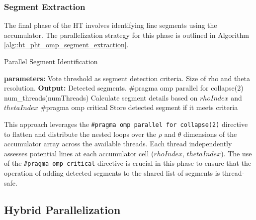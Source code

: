 \documentclass[conference]{IEEEtran}
\begin{document}
             
        \subsubsection{Segment Extraction}
        \label{subsec:omp_segment_extraction}
        
        The final phase of the HT involves identifying line segments using the accumulator. The parallelization strategy for this phase is outlined in Algorithm \ref{alg::ht_pht_omp_segment_extraction}.
        
        \begin{algorithm}
        \caption{Parallel Segment Identification}
        \label{alg::ht_pht_omp_segment_extraction}
        \begin{algorithmic}[1]
        \State \textbf{parameters:}
        \State \hspace{\algorithmicindent} Vote threshold as segment detection criteria.
        \State \hspace{\algorithmicindent} Size of rho and theta resolution.
        \State \textbf{Output:} Detected segments.
            \State \#pragma omp parallel for collapse(2) num\_threads(numThreads)
                    \State Calculate segment details based on $rhoIndex$ and $thetaIndex$
                    \State \#pragma omp critical
                    \State Store detected segment if it meets criteria
                \EndFor
            \EndFor
        \EndProcedure
        \end{algorithmic}
        \end{algorithm}
        
        This approach leverages the \texttt{\#pragma omp parallel for collapse(2)} directive to flatten and distribute the nested loops over the $\rho$ and $\theta$ dimensions of the accumulator array across the available threads. Each thread independently assesses potential lines at each accumulator cell ($rhoIndex$, $thetaIndex$). The use of the \texttt{\#pragma omp critical} directive is crucial in this phase to ensure that the operation of adding detected segments to the shared list of segments is thread-safe.

    \subsection{Hybrid Parallelization}
    \label{subsec:hybrid_parallelization}
    
\end{document}
